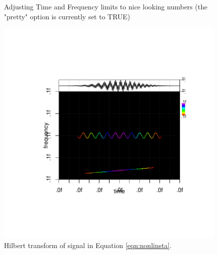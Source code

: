 \documentclass[12pt]{article}
\begin{document}
\begin{figure}[ht]
\begin{center}
\begin{Schunk}
\begin{Soutput}
Adjusting Time and Frequency limits to nice looking numbers (the "pretty" option is currently set to TRUE)
\end{Soutput}
\end{Schunk}
\includegraphics{interesting_signals-nonlinstaht}
\end{center}
\caption{Hilbert transform of signal in Equation \ref{eqn:nonlinsta}.}
\label{fig:nonlinstaht}
\end{figure}
\end{document}
